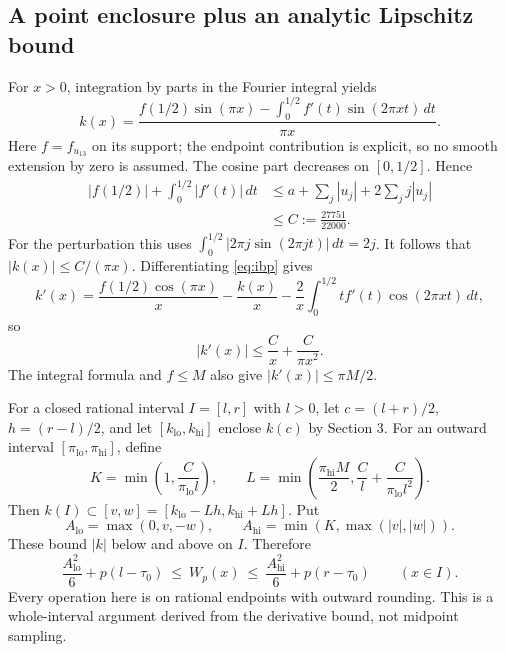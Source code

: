 \documentclass[11pt]{amsart}
\numberwithin{equation}{section}
\newcommand{\lo}{\mathrm{lo}}
\newcommand{\hi}{\mathrm{hi}}
\begin{document}
\subsection{A point enclosure plus an analytic Lipschitz bound}

For $x>0$, integration by parts in the Fourier integral yields
\begin{equation}\label{eq:ibp}
 k(x)=\frac{f(1/2)\sin(\pi x)-
              \int_0^{1/2}f'(t)\sin(2\pi xt)\,dt}{\pi x}.
\end{equation}
Here $f=f_{u_{13}}$ on its support; the endpoint contribution is
explicit, so no smooth extension by zero is assumed. The cosine
part decreases on $[0,1/2]$. Hence
\begin{align*}
 |f(1/2)|+\int_0^{1/2}|f'(t)|\,dt
 &\leq a+\sum_j|u_j|+2\sum_jj|u_j|\\
 &\leq C:=\frac{27751}{22000}.
\end{align*}
For the perturbation this uses
$\int_0^{1/2}|2\pi j\sin(2\pi jt)|\,dt=2j$.
It follows that $|k(x)|\leq C/(\pi x)$. Differentiating
\eqref{eq:ibp} gives
\[
 k'(x)=\frac{f(1/2)\cos(\pi x)}x-\frac{k(x)}x
              -\frac2x\int_0^{1/2}t f'(t)\cos(2\pi xt)\,dt,
\]
so
\begin{equation}\label{eq:decaybounds}
 |k'(x)|\leq\frac Cx+\frac C{\pi x^2}.
\end{equation}
The integral formula and $f\leq M$ also give
$|k'(x)|\leq\pi M/2$.

For a closed rational interval $I=[l,r]$ with $l>0$, let
$c=(l+r)/2$, $h=(r-l)/2$, and let
$[k_{\lo},k_{\hi}]$ enclose $k(c)$ by Section 3. For an outward
interval $[\pi_{\lo},\pi_{\hi}]$, define
\begin{equation}\label{eq:KL}
 K=\min\left(1,\frac C{\pi_{\lo}l}\right),\qquad
 L=\min\left(\frac{\pi_{\hi}M}{2},
                   \frac Cl+\frac C{\pi_{\lo}l^2}\right).
\end{equation}
Then $k(I)\subset[v,w]=[k_{\lo}-Lh,k_{\hi}+Lh]$.
Put
\begin{equation}\label{eq:absolutegate}
 A_{\lo}=\max(0,v,-w),\qquad
 A_{\hi}=\min(K,\max(|v|,|w|)).
\end{equation}
These bound $|k|$ below and above on $I$. Therefore
\begin{equation}\label{eq:Wgate}
 \frac{A_{\lo}^2}{6}+p(l-\tau_0)
 \ \leq\ W_p(x)\ \leq\
 \frac{A_{\hi}^2}{6}+p(r-\tau_0)\qquad(x\in I).
\end{equation}
Every operation here is on rational endpoints with outward rounding.
This is a whole-interval argument derived from the derivative bound,
not midpoint sampling.
\end{document}

